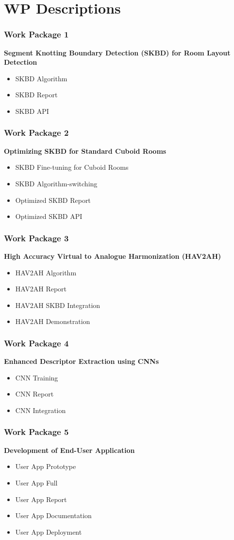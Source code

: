 \documentclass{beamer}
\begin{document}
\section{WP Descriptions}
\begin{frame}
\frametitle{Work Package 1}
\textbf{Segment Knotting Boundary Detection (SKBD) for Room Layout Detection}
\begin{itemize}
    \item SKBD Algorithm
    \item SKBD Report
    \item SKBD API
\end{itemize}
\end{frame}

\begin{frame}
\frametitle{Work Package 2}
\textbf{Optimizing SKBD for Standard Cuboid Rooms}
\begin{itemize}
    \item SKBD Fine-tuning for Cuboid Rooms
    \item SKBD Algorithm-switching
    \item Optimized SKBD Report
    \item Optimized SKBD API
\end{itemize}
\end{frame}

\begin{frame}
\frametitle{Work Package 3}
\textbf{High Accuracy Virtual to Analogue Harmonization (HAV2AH)}
\begin{itemize}
    \item HAV2AH Algorithm
    \item HAV2AH Report
    \item HAV2AH SKBD Integration
    \item HAV2AH Demonstration
\end{itemize}
\end{frame}

\begin{frame}
\frametitle{Work Package 4}
\textbf{Enhanced Descriptor Extraction using CNNs}
\begin{itemize}
    \item CNN Training
    \item CNN Report
    \item CNN Integration
\end{itemize}
\end{frame}

\begin{frame}
\frametitle{Work Package 5}
\textbf{Development of End-User Application}
\begin{itemize}
    \item User App Prototype
    \item User App Full
    \item User App Report
    \item User App Documentation
    \item User App Deployment
\end{itemize}
\end{frame}
\end{document}
